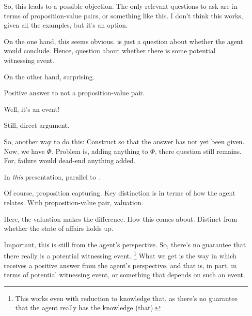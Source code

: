 \begin{note}
  \begin{argument}
    {
      \color{blue}
      So, this leads to a possible objection.
      The only relevant questions to ask are in terms of proposition-value pairs, or something like this.
      I don't think this works, given all the examples, but it's an option.
    }
  \end{argument}

  On the one hand, this seems obvious.
  \qzS{} is just a question about whether the agent would conclude.
  Hence, question about whether there is some potential witnessing event.

  On the other hand, surprising.

  \begin{corollary}
    Positive answer to \qzS{} not a proposition-value pair.
  \end{corollary}
  \begin{argument}
    Well, it's an event!
  \end{argument}
  Still, direct argument.
  \begin{argument}
    {
      \color{green}
      So, another way to do this:
      Construct so that the answer has not yet been given.
      Now, we have \(\Phi\).
      Problem is, adding anything to \(\Phi\), there question still remains.
      For, failure would dead-end anything added.

      In \emph{this} presentation, parallel to \citeauthor{Carroll:1895uj}.
    }
  \end{argument}

  Of course, proposition capturing.
  Key distinction is in terms of how the agent relates.
  With proposition-value pair, valuation.

  Here, the valuation makes the difference.
  How this comes about.
  Distinct from whether the state of affairs holds up.

  Important, this is still from the agent's perspective.
  So, there's no guarantee that there really is a potential witnessing event.%
  \footnote{
    This works even with reduction to knowledge that, as there's no guarantee that the agent really has the knowledge (that).
  }
  What we get is the way in which \qzS{} receives a positive answer from the agent's perspective, and that is, in part, in terms of potential witnessing event, or something that depends on such an event.
\end{note}

